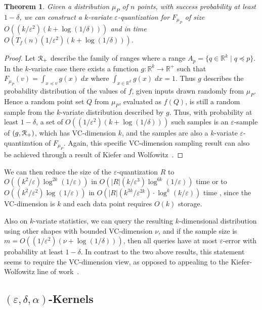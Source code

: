 \documentclass{journal}
\newcommand{\eps}{\varepsilon}
\newcommand{\Eu}[1]{\ensuremath{\EuScript{#1}}}
\newcommand{\R}{\ensuremath{\mathbb{R}}}
\newtheorem {theorem}{Theorem}[section]
\begin{document}
\begin{theorem}
Given a distribution $\mu_P$ of $n$ points, with success probability at least $1-\delta$, we can construct a $k$-variate $\eps$-quantization for $F_{\mu_P}$
of size $O((k/\eps^2)(k +  \log(1/\delta)))$ and in time $O(T_f(n) (1/\eps^2)(k + \log(1/ \delta)))$. \label{thm:k-var-q}
\end{theorem}
\begin{proof}
Let $\Eu{R}_+$ describe the family of ranges where a range $A_p = \{q \in \R^k \mid q \preceq p\}$.
In the $k$-variate case there exists a function $g : \R^k \to \R^+$ such that $F_{\mu_P}(v) = \int_{x \preceq v} g(x) \; dx$ where $\int_{x \in \R^k} g(x) \; dx = 1$.  Thus $g$ describes the probability distribution of the values of $f$, given inputs drawn randomly from $\mu_P$.  Hence a random point set $Q$ from $\mu_P$, evaluated as $f(Q)$, is still a random sample from the $k$-variate distribution described by $g$.  Thus, with probability at least $1-\delta$, a set of $O((1/\eps^2)(k + \log (1/\delta)))$ such samples is an $\eps$-sample of $(g,\Eu{R}_+)$, which has VC-dimension $k$, and the samples are also a $k$-variate $\eps$-quantization of $F_{\mu_P}$.  Again, this specific VC-dimension sampling result can also be achieved through a result of Kiefer and Wolfowitz~\cite{KW58}.  
\end{proof}

We can then reduce the size of the $\eps$-quantization $R$ to $O((k^2/\eps) \log^{2k} (1/\eps))$ in $O(|R| (k/\eps^3) \log^{6k} (1/\eps))$ time \cite{Phi08} or to $O((k^2/\eps^2) \log (1/\eps))$ in $O(|R|(k^{3k}/\eps^{2k}) \cdot \log^k(k/\eps))$ time \cite{CM96}, since the VC-dimension is $k$ and each data point requires $O(k)$ storage.


Also on $k$-variate statistics, we can query the resulting $k$-dimensional distribution using other shapes with bounded VC-dimension $\nu$, and if the sample size is $m = O((1/\eps^2)(\nu + \log(1/\delta)))$, then all queries have at most $\eps$-error with probability at least $1-\delta$.  In contrast to the two above results, this statement seems to require the VC-dimension view, as opposed to appealing to the Kiefer-Wolfowitz line of work~\cite{DKW56,KW58}.  





\subsection{$(\eps, \delta, \alpha)$-Kernels}
\label{sec:ea-kernel}
\end{document}
